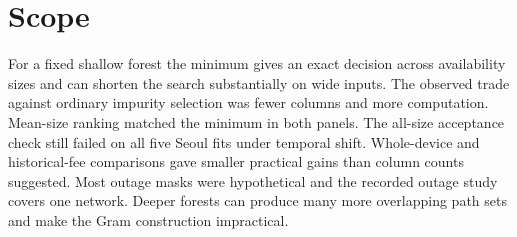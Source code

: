 \section{Scope}
For a fixed shallow forest the minimum gives an exact decision across
availability sizes and can shorten the search substantially on wide
inputs. The observed trade against ordinary impurity selection was fewer
columns and more computation. Mean-size ranking matched the minimum in
both panels. The all-size acceptance check still failed on all five
Seoul fits under temporal shift. Whole-device and historical-fee
comparisons gave smaller practical gains than column counts suggested.
Most outage masks were hypothetical and the recorded outage study covers
one network. Deeper forests can produce many more overlapping path sets
and make the Gram construction impractical.
